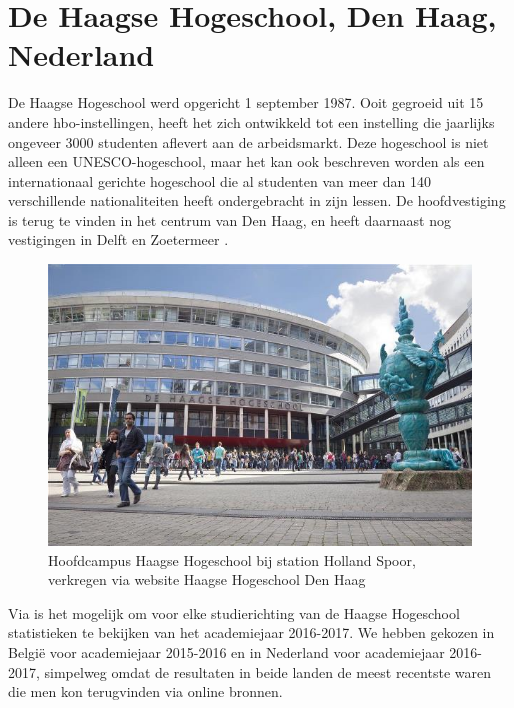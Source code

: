 \section{De Haagse Hogeschool, Den Haag, Nederland}
\label{sec:haagsehogeschool}

De Haagse Hogeschool werd opgericht 1 september 1987. Ooit gegroeid uit 15 andere hbo-instellingen, heeft het zich ontwikkeld tot een instelling die jaarlijks ongeveer 3000 studenten aflevert aan de arbeidsmarkt. Deze hogeschool is niet alleen een UNESCO-hogeschool, maar het kan ook beschreven worden als een internationaal gerichte hogeschool die al studenten van meer dan 140 verschillende nationaliteiten heeft ondergebracht in zijn lessen. De hoofdvestiging is terug te vinden in het centrum van Den Haag, en heeft daarnaast nog vestigingen in Delft en Zoetermeer \autocite{HaagseHogeschool2017}. 

\begin{figure}[!h]
	\includegraphics[width=\textwidth]
	{img/haagse_hogeschool.jpg}
	\caption{Hoofdcampus Haagse Hogeschool bij station Holland Spoor, verkregen via website Haagse Hogeschool Den Haag \autocite{Hogeschool2018}}
	\label{fig:haagsehogeschool}
\end{figure}

Via \textcite{Studiekeuze2017} is het mogelijk om voor elke studierichting van de Haagse Hogeschool statistieken te bekijken van het academiejaar 2016-2017. We hebben gekozen in België voor academiejaar 2015-2016 en in Nederland voor academiejaar 2016-2017, simpelweg omdat de resultaten in beide landen de meest recentste waren die men kon terugvinden via online bronnen.

